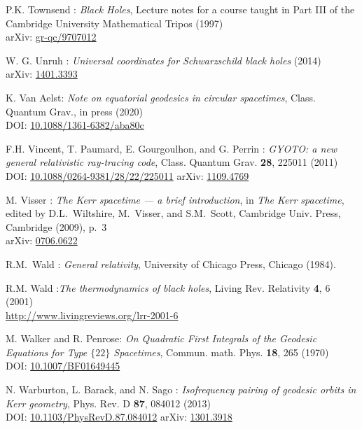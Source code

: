 \begin{thebibliography}{123}
P.K. Townsend : {\em Black Holes}, Lecture notes for a course taught in Part III
of the Cambridge University Mathematical Tripos (1997) \\
arXiv: \href{https://arxiv.org/abs/gr-qc/9707012}{gr-qc/9707012}

W. G. Unruh : {\em Universal coordinates for Schwarzschild black holes} (2014)\\
arXiv: \href{https://arxiv.org/abs/1401.3393}{1401.3393}

K. Van Aelst: {\em Note on equatorial geodesics in circular spacetimes},
Class. Quantum Grav., in press (2020)\\
DOI: \href{https://doi.org/10.1088/1361-6382/aba80c}{10.1088/1361-6382/aba80c}

F.H. Vincent, T. Paumard, E. Gourgoulhon, and G. Perrin :
{\em GYOTO: a new general relativistic ray-tracing code},
Class. Quantum Grav. {\bf 28}, 225011 (2011)\\
DOI: \href{https://doi.org/10.1088/0264-9381/28/22/225011}{10.1088/0264-9381/28/22/225011}
\hfill
arXiv: \href{https://arxiv.org/abs/1109.4769}{1109.4769}

M. Visser : {\em The Kerr spacetime --- a brief introduction},
in {\em The Kerr spacetime}, edited by D.L.~Wiltshire, M.~Visser, and S.M.~Scott,
Cambridge Univ. Press, Cambridge (2009), p.~3\\
arXiv: \href{https://arxiv.org/abs/0706.0622}{0706.0622}

R.M.~Wald : {\em General relativity},
University of Chicago Press, Chicago (1984).

R.M. Wald :{\em The thermodynamics of black holes},
Living Rev. Relativity {\bf 4}, 6 (2001) \\
\url{http://www.livingreviews.org/lrr-2001-6}

M. Walker and R. Penrose: {\em On Quadratic First Integrals of the Geodesic Equations
for Type $\{22\}$ Spacetimes},
Commun. math. Phys. {\bf 18}, 265 (1970)\\
DOI: \href{https://doi.org/10.1007/BF01649445}{10.1007/BF01649445}

N. Warburton, L. Barack, and N. Sago :
{\em Isofrequency pairing of geodesic orbits in Kerr geometry},
Phys. Rev. D {\bf 87}, 084012 (2013)\\
DOI: \href{https://doi.org/10.1103/PhysRevD.87.084012}{10.1103/PhysRevD.87.084012}\hfill
arXiv: \href{https://arxiv.org/abs/1301.3918}{1301.3918}


\end{thebibliography}
